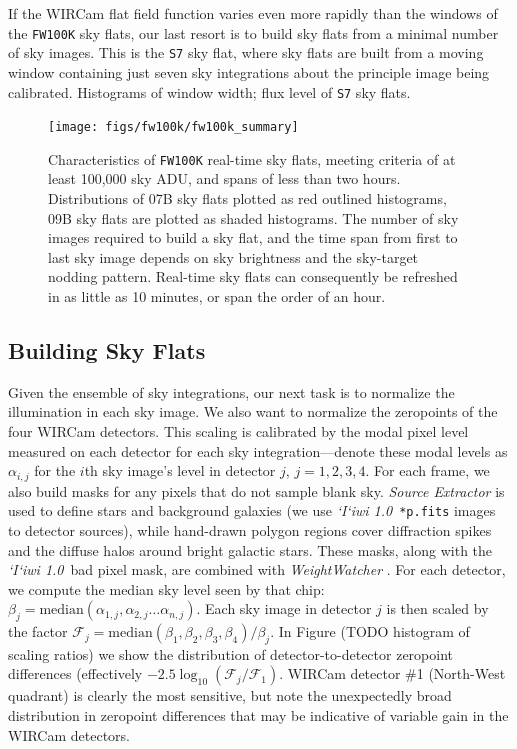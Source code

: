 \documentclass[iop]{emulateapj}
\newcommand{\sw}[1]{\textit{#1}} %
\newcommand{\iiwione}{\sw{`I`iwi 1.0}}
\newcommand{\todo}[1]{\textcolor{RedOrange}{#1}} %
\begin{document}
If the WIRCam flat field function varies even more rapidly than the windows of the \texttt{FW100K} sky flats, our last resort is to build sky flats from a minimal number of sky images.
This is the \texttt{S7} sky flat, where sky flats are built from a moving window containing just seven sky integrations about the principle image being calibrated.
\todo{Histograms of window width; flux level of \texttt{S7} sky flats}.

\begin{figure}[t]
\centering
\texttt{[image: figs/fw100k/fw100k\_summary]}
\caption{Characteristics of \texttt{FW100K} real-time sky flats, meeting criteria of at least 100,000 sky ADU, and spans of less than two hours.
Distributions of 07B sky flats plotted as red outlined histograms, 09B sky flats are plotted as shaded histograms.
The number of sky images required to build a sky flat, and the time span from first to last sky image depends on sky brightness and the sky-target nodding pattern.
Real-time sky flats can consequently be refreshed in as little as 10 minutes, or span the order of an hour.}
\label{fig:fw100k_summary}
\end{figure}

\subsection{Building Sky Flats}
\label{sec:flatbuilding}

Given the ensemble of sky integrations, our next task is to normalize the illumination in each sky image.
We also want to normalize the zeropoints of the four WIRCam detectors.
This scaling is calibrated by the modal pixel level measured on each detector for each sky integration---denote these modal levels as $\alpha_{i,j}$ for the $i$th sky image's level in detector $j$, $j=1, 2, 3, 4$.
For each frame, we also build masks for any pixels that do not sample blank sky. \sw{Source Extractor} \citep{Bertin:1996} is used to define stars and background galaxies (we use \iiwione\ \texttt{*p.fits} images to detector sources), while hand-drawn polygon regions cover diffraction spikes and the diffuse halos around bright galactic stars. These masks, along with the \iiwione\ bad pixel mask, are combined with \sw{WeightWatcher} \citep{Marmo:2008}.
For each detector, we compute the median sky level seen by that chip: $\beta_j = \mathrm{median}(\alpha_{1,j}, \alpha_{2,j}\ldots \alpha_{n,j} )$.
Each sky image in detector $j$ is then scaled by the factor $\mathcal{F}_j = \mathrm{median}(\beta_1, \beta_2, \beta_3, \beta_4) / \beta_j$.
In Figure (\todo{TODO histogram of scaling ratios}) we show the distribution of detector-to-detector zeropoint differences (effectively $-2.5 \log_{10}(\mathcal{F}_j / \mathcal{F}_1)$.
WIRCam detector \#1 (North-West quadrant) is clearly the most sensitive, but note the unexpectedly broad distribution in zeropoint differences that may be indicative of variable gain in the WIRCam detectors.
\end{document}
